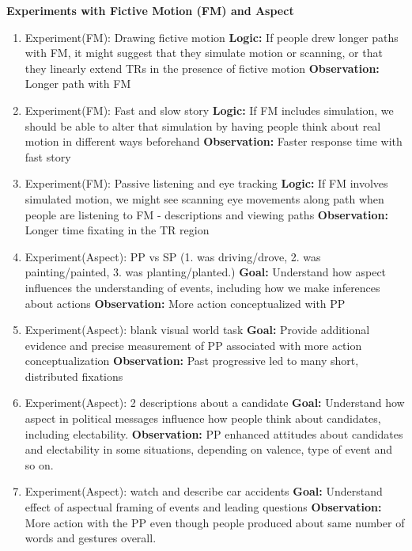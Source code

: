 \documentclass{article}
\begin{document}
\newpage
\noindent \textbf{Experiments with Fictive Motion (FM) and Aspect}
\begin{enumerate}
    \item Experiment(FM): Drawing fictive motion 
        \subitem \textbf{\textbf{Logic:}} If people drew longer paths with FM, it might suggest that they simulate motion or scanning, or that they linearly extend TRs in the presence of fictive motion
        \subitem \textbf{Observation:} Longer path with FM
    \item Experiment(FM): Fast and slow story
        \subitem \textbf{Logic:} If FM includes simulation, we should be able to alter that simulation by having people think about real motion in different ways beforehand
        \subitem \textbf{Observation:} Faster response time with fast story
    \item Experiment(FM): Passive listening and eye tracking
        \subitem \textbf{Logic:} If FM involves simulated motion, we might see scanning eye movements along path when people are listening to FM - descriptions and viewing paths
        \subitem \textbf{Observation:} Longer time fixating in the TR region
    \item Experiment(Aspect): PP vs SP (1. was driving/drove, 2. was painting/painted, 3. was planting/planted.) 
        \subitem \textbf{Goal:} Understand how aspect influences the understanding of events, including how we make inferences about actions
        \subitem \textbf{Observation:} More action conceptualized with PP
    \item Experiment(Aspect): blank visual world task
        \subitem \textbf{Goal:} Provide additional evidence and precise measurement of PP associated with more action conceptualization
        \subitem \textbf{Observation:} Past progressive led to many short, distributed fixations
    \item Experiment(Aspect): 2 descriptions about a candidate
        \subitem \textbf{Goal:} Understand how aspect in political messages influence how people think about candidates, including electability. 
        \subitem \textbf{Observation:} PP enhanced attitudes about candidates and electability in some situations, depending on valence, type of event and so on. 
    \item Experiment(Aspect): watch and describe car accidents
        \subitem \textbf{Goal:} Understand effect of aspectual framing of events and leading questions
        \subitem \textbf{Observation:} More action with the PP even though people produced about same number of words and gestures overall. 
\end{enumerate}
\end{document}
